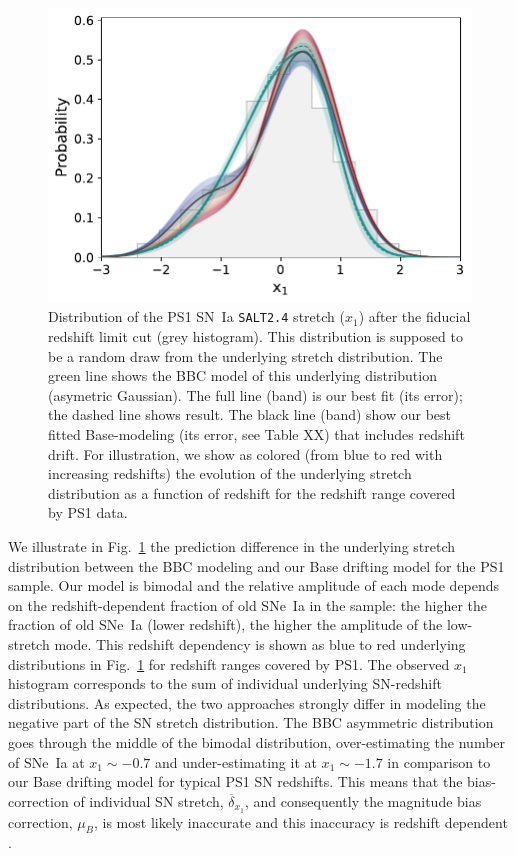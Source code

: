 \documentclass[]{aa} %
\begin{document}
\begin{figure}
    \centering
    \includegraphics[width=\linewidth]{Article_figures/bbc_comp_PS1_hist-nr.pdf}
    \caption{Distribution of the PS1 SN~Ia \textsc{\texttt{SALT2.4}} stretch
        ($x_1$) after the fiducial redshift limit cut (grey histogram). This
        distribution is supposed to be a random draw from the underlying
        stretch distribution. The green line shows the BBC model of this
        underlying distribution (asymetric Gaussian). The full line (band) is
        our best fit (its error); the dashed line shows \cite{scolnic2018a}
        result. The black line (band) show our best fitted Base-modeling (its
        error, see Table XX) that includes redshift drift. For illustration, we
        show as colored (from blue to red with increasing redshifts) the
    evolution of the underlying stretch distribution as a function of redshift
for the redshift range covered by PS1 data.}
    \label{fig:bbc_pdf_ps1}
\end{figure}

We illustrate in Fig.~\ref{fig:bbc_pdf_ps1} the prediction difference in the
underlying stretch distribution between the BBC modeling and our Base drifting
model for the PS1 sample. Our model is bimodal and the relative amplitude of
each mode depends on the redshift-dependent fraction of old SNe~Ia in the
sample: the higher the fraction of old SNe~Ia (lower redshift), the higher the
amplitude of the low-stretch mode. This redshift dependency is shown as blue to
red underlying distributions in Fig.~\ref{fig:bbc_pdf_ps1} for redshift ranges
covered by PS1. The observed $x_1$ histogram corresponds to the sum of
individual underlying SN-redshift distributions. As expected, the two approaches
strongly differ in modeling the negative part of the SN stretch distribution.
The BBC asymmetric distribution goes through the middle of the bimodal
distribution, over-estimating the number of SNe~Ia at $x_1\sim-0.7$ and
under-estimating it at $x_1\sim-1.7$ in comparison to our Base drifting
model for typical PS1 SN redshifts. This means that the bias-correction of
individual SN stretch, $\overline{\delta}_{x_1}$, \citep{kessler2017} and
consequently the magnitude bias correction, $\mu_B$, is most likely inaccurate
and this inaccuracy is redshift dependent . 
\end{document}
